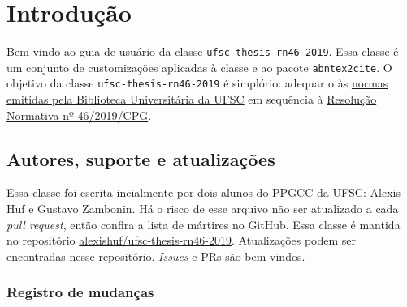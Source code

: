 \documentclass[embeddedlogo]{../ufsc-thesis-rn46-2019}
\begin{document}

\pretextual%
\imprimircapa%
\imprimirfolhaderosto*
\protect{}
\imprimirfolhadecertificacao
\clearpage \listoffigures*
\clearpage \tableofcontents*%

\textual%

\chapter{Introdução}

Bem-vindo ao guia de usuário da classe \texttt{ufsc-thesis-rn46-2019}. Essa
classe é um conjunto de customizações aplicadas à classe
\href{https://ctan.org/pkg/abntex2}{\abnTeX} e ao pacote \texttt{abntex2cite}.
O objetivo da classe \texttt{ufsc-thesis-rn46-2019} é simplório: adequar o
\abnTeX{} às \href{http://portal.bu.ufsc.br/normalizacao/}{normas emitidas pela
Biblioteca Universitária da UFSC} em sequência à
\href{https://repositorio.ufsc.br/handle/123456789/197121}{Resolução Normativa
nº 46/2019/CPG}.


\section{Autores, suporte e atualizações}

Essa classe foi escrita incialmente por dois alunos do
\href{http://ppgcc.posgrad.ufsc.br/}{PPGCC da UFSC}: Alexis Huf e Gustavo
Zambonin. Há o risco de esse arquivo não ser atualizado a cada \textit{pull
request}, então confira a lista de mártires no GitHub. Essa classe é mantida no
repositório
\href{https://github.com/alexishuf/ufsc-thesis-rn46-2019/}{alexishuf/ufsc-thesis-rn46-2019}.
Atualizações podem ser encontradas nesse repositório. \textit{Issues} e PRs
são bem vindos.

\subsection{Registro de mudanças}
\end{document}
